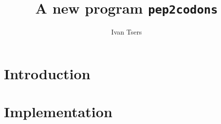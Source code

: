 \documentclass[a4paper]{article}
\begin{document}
\pagestyle{noweb}

\title{A new program \texttt{pep2codons}}
\author{Ivan Tsers}
\date{}
\maketitle

\tableofcontents

\section{Introduction}

\section{Implementation}



\end{document}
